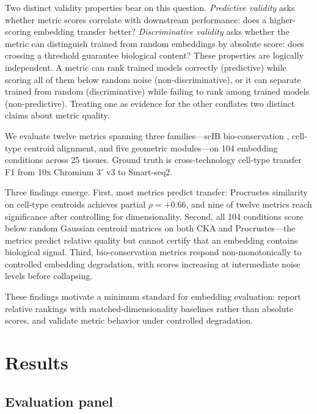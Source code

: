 \documentclass[11pt]{article}
\begin{document}
Two distinct validity properties bear on this question. \emph{Predictive
validity} asks whether metric scores correlate with downstream
performance: does a higher-scoring embedding transfer better?
\emph{Discriminative validity} asks whether the metric can distinguish
trained from random embeddings by absolute score: does crossing a
threshold guarantee biological content? These properties are logically
independent. A metric can rank trained models correctly (predictive)
while scoring all of them below random noise (non-discriminative), or
it can separate trained from random (discriminative) while failing to
rank among trained models (non-predictive). Treating one as evidence for
the other conflates two distinct claims about metric quality.

We evaluate twelve metrics spanning three families---scIB
bio-conservation \citep{luecken2022scib}, cell-type centroid alignment,
and five geometric modules---on 104 embedding conditions across 25
tissues. Ground truth is cross-technology cell-type transfer F1 from
10x Chromium 3$'$ v3 to Smart-seq2.

Three findings emerge. First, most metrics predict transfer: Procrustes
similarity on cell-type centroids achieves partial $\rho = +0.66$, and
nine of twelve metrics reach significance after controlling for
dimensionality. Second, all 104 conditions score below random Gaussian
centroid matrices on both CKA and Procrustes---the metrics predict
relative quality but cannot certify that an embedding contains
biological signal. Third, bio-conservation metrics respond
non-monotonically to controlled embedding degradation, with scores
increasing at intermediate noise levels before collapsing.

These findings motivate a minimum standard for embedding evaluation:
report relative rankings with matched-dimensionality baselines rather
than absolute scores, and validate metric behavior under controlled
degradation.


\section{Results}

\subsection{Evaluation panel}
\label{sec:panel}
\end{document}
